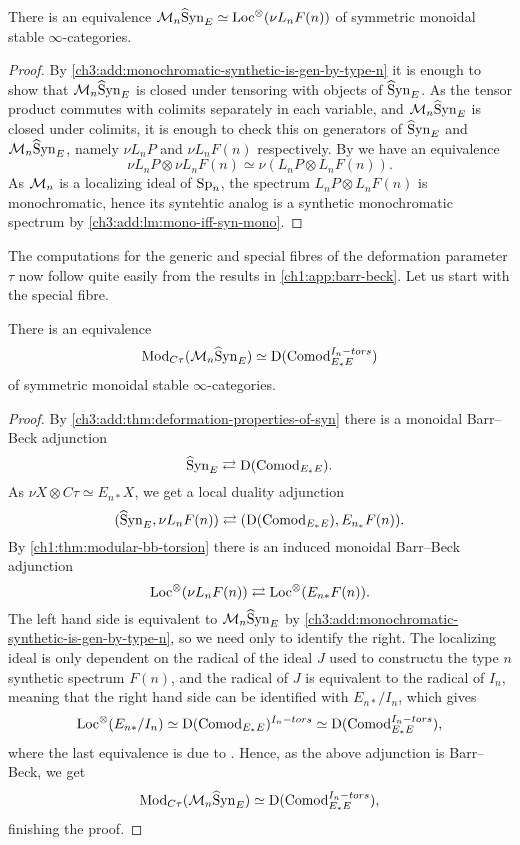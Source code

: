 \begin{lemma}
    There is an equivalence $\mathcal{M}_{n}\widehat{\mathrm{S}}\mathrm{yn}_{E} \simeq \operatorname{Loc}^\otimes(\nu L_n F(n))$ of symmetric monoidal stable $\infty$-categories. 
\end{lemma}
\begin{proof}
    By \cref{ch3:add:monochromatic-synthetic-is-gen-by-type-n} it is enough to show that $\mathcal{M}_{n}\widehat{\mathrm{S}}\mathrm{yn}_{E}$ is closed under tensoring with objects of $\widehat{\mathrm{S}}\mathrm{yn}_{E}$. As the tensor product commutes with colimits separately in each variable, and $\mathcal{M}_{n}\widehat{\mathrm{S}}\mathrm{yn}_{E}$ is closed under colimits, it is enough to check this on generators of $\widehat{\mathrm{S}}\mathrm{yn}_{E}$ and $\mathcal{M}_{n}\widehat{\mathrm{S}}\mathrm{yn}_{E}$, namely $\nu L_n P$ and $\nu L_n F(n)$ respectively. By \cite[4.24]{pstragowski_2022} we have an equivalence 
    \[\nu L_n P \otimes \nu L_n F(n) \simeq \nu(L_n P \otimes L_n F(n)).\]
    As $\mathcal{M}_{n}$ is a localizing ideal of $\mathrm{Sp}_n$, the spectrum $L_n P \otimes L_n F(n)$ is monochromatic, hence its syntehtic analog is a synthetic monochromatic spectrum by \cref{ch3:add:lm:mono-iff-syn-mono}. 
\end{proof}

The computations for the generic and special fibres of the deformation parameter $\tau$ now follow quite easily from the results in \cref{ch1:app:barr-beck}. Let us start with the special fibre. 

\begin{theorem}
    \label{ch3:add:thm:monochromatic-synthetic-special-fiber}
    There is an equivalence
    \[\mathrm{Mod}_{C\tau}(\mathcal{M}_{n}\widehat{\mathrm{S}}\mathrm{yn}_{E}) \simeq \mathrm{D}(\mathrm{Comod}_{E_*E}^{I_n-tors})\]
    of symmetric monoidal stable $\infty$-categories. 
\end{theorem}
\begin{proof}
    By \cref{ch3:add:thm:deformation-properties-of-syn} there is a monoidal Barr--Beck adjunction 
    \[\widehat{\mathrm{S}}\mathrm{yn}_{E} \rightleftarrows \mathrm{D}(\mathrm{Comod}_{E_*E}).\]
    As $\nu X \otimes C\tau \simeq E_{n*} X$, we get a local duality adjunction 
    \[(\widehat{\mathrm{S}}\mathrm{yn}_{E}, \nu L_n F(n))\rightleftarrows (\mathrm{D}(\mathrm{Comod}_{E_*E}), E_{n_*}F(n)).\]
    By \cref{ch1:thm:modular-bb-torsion} there is an induced monoidal Barr--Beck adjunction 
    \[\operatorname{Loc}^\otimes(\nu L_n F(n))\rightleftarrows \operatorname{Loc}^\otimes(E_{n*}F(n)).\]
    The left hand side is equivalent to $\mathcal{M}_{n}\widehat{\mathrm{S}}\mathrm{yn}_{E}$ by \cref{ch3:add:monochromatic-synthetic-is-gen-by-type-n}, so we need only to identify the right. The localizing ideal is only dependent on the radical of the ideal $J$ used to constructu the type $n$ synthetic spectrum $F(n)$, and the radical of $J$ is equivalent to the radical of $I_n$, meaning that the right hand side can be identified with $E_{n*}/I_n$, which gives 
    \[\operatorname{Loc}^\otimes(E_{n*}/I_n) \simeq \mathrm{D}(\mathrm{Comod}_{E_*E})^{I_n-tors}\simeq \mathrm{D}(\mathrm{Comod}_{E_*E}^{I_n-tors}),\]
    where the last equivalence is due to \cite[3.7(2)]{barthel-heard-valenzuela_2020}. Hence, as the above adjunction is Barr--Beck, we get 
    \[\mathrm{Mod}_{C\tau}(\mathcal{M}_{n}\widehat{\mathrm{S}}\mathrm{yn}_{E}) \simeq \mathrm{D}(\mathrm{Comod}_{E_*E}^{I_n-tors}),\]
    finishing the proof. 
\end{proof}

